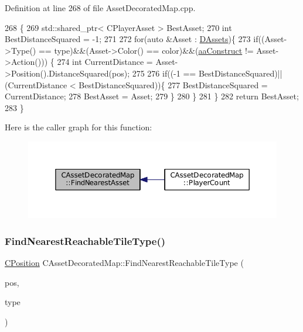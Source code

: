 Definition at line 268 of file Asset\+Decorated\+Map.\+cpp.


\begin{DoxyCode}
268                                                                                                            
                    \{
269     std::shared\_ptr< CPlayerAsset > BestAsset;
270     \textcolor{keywordtype}{int} BestDistanceSquared = -1;
271     
272     \textcolor{keywordflow}{for}(\textcolor{keyword}{auto} &Asset : \hyperlink{classCAssetDecoratedMap_a94eeed5b16141169b1ba6cb3842055aa}{DAssets})\{
273         \textcolor{keywordflow}{if}((Asset->Type() == type)&&(Asset->Color() == color)&&(\hyperlink{GameDataTypes_8h_ab47668e651a3032cfb9c40ea2d60d670a7ef6b863f66dd7dcc95a199cd758ae1d}{aaConstruct} != Asset->Action()))
      \{
274             \textcolor{keywordtype}{int} CurrentDistance = Asset->Position().DistanceSquared(pos);
275             
276             \textcolor{keywordflow}{if}((-1 == BestDistanceSquared)||(CurrentDistance < BestDistanceSquared))\{
277                 BestDistanceSquared = CurrentDistance;
278                 BestAsset = Asset;
279             \}
280         \}
281     \}
282     \textcolor{keywordflow}{return} BestAsset;
283 \}
\end{DoxyCode}
Here is the caller graph for this function\+:\nopagebreak
\begin{figure}[H]
\begin{center}
\leavevmode
\includegraphics[width=350pt]{classCAssetDecoratedMap_a37f9ffaf70ea515c422544a52dd80483_icgraph}
\end{center}
\end{figure}
\hypertarget{classCAssetDecoratedMap_a9e9eed95b427443d196b56b852cdeb9d}{}\label{classCAssetDecoratedMap_a9e9eed95b427443d196b56b852cdeb9d} 
\subsubsection{\texorpdfstring{Find\+Nearest\+Reachable\+Tile\+Type()}{FindNearestReachableTileType()}}
{\footnotesize\ttfamily \hyperlink{classCPosition}{C\+Position} C\+Asset\+Decorated\+Map\+::\+Find\+Nearest\+Reachable\+Tile\+Type (\begin{DoxyParamCaption}\item[{const \hyperlink{classCPosition}{C\+Position} \&}]{pos,  }\item[{\hyperlink{classCTerrainMap_aff2ab991e237269941416dd79d8871d4}{E\+Tile\+Type}}]{type }\end{DoxyParamCaption})}



